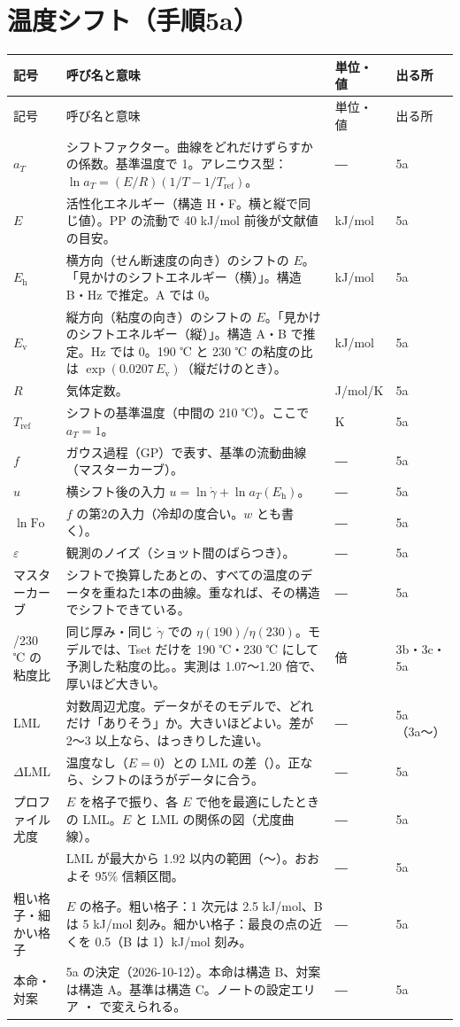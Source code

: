 \documentclass[paper=a4paper,fontsize=10.5pt,line_length=44zw,number_of_lines=38]{jlreq}
\makeatletter
\newcommand{\file}[1]{\texttt{\detokenize{#1}}}
\newcommand{\gd}{\dot{\gamma}}
\newcommand{\Eh}{E_{\mathrm{h}}}
\newcommand{\Ev}{E_{\mathrm{v}}}
\newenvironment{symtab}{%
  \begin{longtable}{@{}>{\raggedright\arraybackslash}p{6.5\zw}>{\raggedright\arraybackslash}p{22\zw}>{\raggedright\arraybackslash}p{6\zw}>{\raggedright\arraybackslash}p{4.5\zw}@{}}
  \toprule 記号 & 呼び名と意味 & 単位・値 & 出る所 \\ \midrule \endfirsthead
  \toprule 記号 & 呼び名と意味 & 単位・値 & 出る所 \\ \midrule \endhead
  \bottomrule \endlastfoot}{\end{longtable}}
\makeatother
\begin{document}
\section{温度シフト（手順5a）}

\begin{symtab}
$a_T$ & シフトファクター。曲線をどれだけずらすかの係数。基準温度で 1。アレニウス型：$\ln a_T = (E/R)(1/T - 1/T_{\mathrm{ref}})$。 & ― & 5a \\
$E$ & 活性化エネルギー（構造 H・F。横と縦で同じ値）。PP の流動で 40 kJ/mol 前後が文献値の目安。 & kJ/mol & 5a \\
$\Eh$ & 横方向（せん断速度の向き）のシフトの $E$。「見かけのシフトエネルギー（横）」。構造 B・Hz で推定。A では 0。 & kJ/mol & 5a \\
$\Ev$ & 縦方向（粘度の向き）のシフトの $E$。「見かけのシフトエネルギー（縦）」。構造 A・B で推定。Hz では 0。190 ℃ と 230 ℃ の粘度の比は $\exp(0.0207\,\Ev)$（縦だけのとき）。 & kJ/mol & 5a \\
$R$ & 気体定数。 & 8.314 J/mol/K & 5a \\
$T_{\mathrm{ref}}$ & シフトの基準温度（中間の 210 ℃）。ここで $a_T=1$。 & 483.15 K & 5a \\
$f$ & ガウス過程（GP）で表す、基準の流動曲線（マスターカーブ）。 & ― & 5a \\
$u$ & 横シフト後の入力 $u = \ln\gd + \ln a_T(\Eh)$。 & ― & 5a \\
$\ln\mathrm{Fo}$ & $f$ の第2の入力（冷却の度合い。$w$ とも書く）。 & ― & 5a \\
$\varepsilon$ & 観測のノイズ（ショット間のばらつき）。 & ― & 5a \\
マスターカーブ & シフトで換算したあとの、すべての温度のデータを重ねた1本の曲線。重なれば、その構造でシフトできている。 & ― & 5a \\
190/230 ℃ の粘度比 & 同じ厚み・同じ $\gd$ での $\eta(190)/\eta(230)$。モデルでは、Tset だけを 190 ℃・230 ℃ にして予測した粘度の比。\file{ratio_190_230}。実測は 1.07〜1.20 倍で、厚いほど大きい。 & 倍 & 3b・3c・5a \\
LML & 対数周辺尤度。データがそのモデルで、どれだけ「ありそう」か。大きいほどよい。差が 2〜3 以上なら、はっきりした違い。 & ― & 5a（3a〜） \\
$\Delta$LML & 温度なし（$E=0$）との LML の差（\file{dLML_vs_E0}）。正なら、シフトのほうがデータに合う。 & ― & 5a \\
プロファイル尤度 & $E$ を格子で振り、各 $E$ で他を最適にしたときの LML。$E$ と LML の関係の図（尤度曲線）。 & ― & 5a \\
1.92 & LML が最大から 1.92 以内の範囲（\file{E_95_lo}〜\file{E_95_hi}）。おおよそ 95\% 信頼区間。 & ― & 5a \\
粗い格子・細かい格子 & $E$ の格子。粗い格子：1 次元は 2.5 kJ/mol、B は 5 kJ/mol 刻み。細かい格子：最良の点の近くを 0.5（B は 1）kJ/mol 刻み。 & ― & 5a \\
本命・対案 & 5a の決定（2026-10-12）。本命は構造 B、対案は構造 A。基準は構造 C。ノートの設定エリア \file{MAIN_STRUCT}・\file{ALT_STRUCT} で変えられる。 & ― & 5a \\
\end{symtab}
\end{document}
